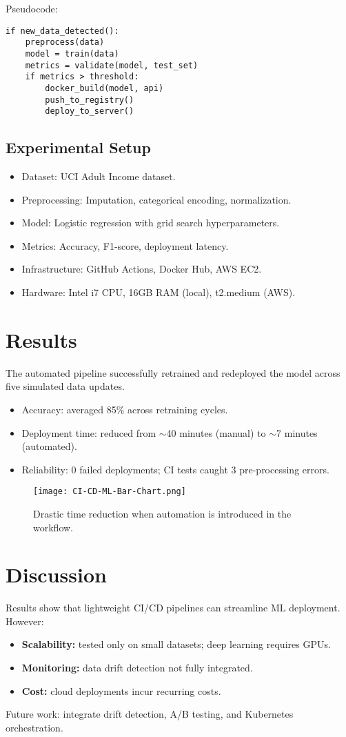 \documentclass[11pt]{article}
\begin{document}
\noindent Pseudocode:
\begin{verbatim}
if new_data_detected():
    preprocess(data)
    model = train(data)
    metrics = validate(model, test_set)
    if metrics > threshold:
        docker_build(model, api)
        push_to_registry()
        deploy_to_server()
\end{verbatim}

\subsection{Experimental Setup}
\begin{itemize}
    \item Dataset: UCI Adult Income dataset.
    \item Preprocessing: Imputation, categorical encoding, normalization.
    \item Model: Logistic regression with grid search hyperparameters.
    \item Metrics: Accuracy, F1-score, deployment latency.
    \item Infrastructure: GitHub Actions, Docker Hub, AWS EC2.
    \item Hardware: Intel i7 CPU, 16GB RAM (local), t2.medium (AWS).
\end{itemize}

\section{Results} \label{sec:results}
The automated pipeline successfully retrained and redeployed the model across five simulated data updates.
\begin{itemize}
    \item Accuracy: averaged 85\% across retraining cycles.
    \item Deployment time: reduced from $\sim$40 minutes (manual) to $\sim$7 minutes (automated).
    \item Reliability: 0 failed deployments; CI tests caught 3 pre-processing errors.
\end{itemize}

\begin{figure}[h]
    \centering
    \texttt{[image: CI-CD-ML-Bar-Chart.png]}
    \caption{Drastic time reduction when automation is introduced in the workflow.}
    \label{fig:pipeline}
\end{figure}

\section{Discussion} \label{sec:discussion}
Results show that lightweight CI/CD pipelines can streamline ML deployment. However:
\begin{itemize}
    \item \textbf{Scalability:} tested only on small datasets; deep learning requires GPUs.
    \item \textbf{Monitoring:} data drift detection not fully integrated.
    \item \textbf{Cost:} cloud deployments incur recurring costs.
\end{itemize}
Future work: integrate drift detection, A/B testing, and Kubernetes orchestration.
\end{document}
